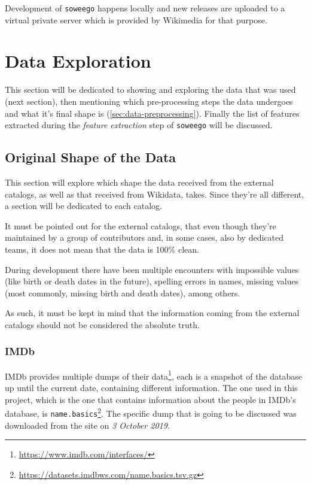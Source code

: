 \documentclass[epsfig,a4paper,11pt,titlepage,twoside,openany]{book}
\newcommand{\footurl}[1]{\footnote{\url{#1}}}
\begin{document}
Development of \texttt{soweego} happens locally and new releases are uploaded to a virtual private server which is provided by Wikimedia for that purpose. 



\section{Data Exploration}
\label{sec:data-exploration}

This section will be dedicated to showing and exploring the data that was used (next section), then mentioning which pre-processing steps the data undergoes and what it's final shape is (\autoref{sec:data-preprocessing}). Finally the list of features extracted during the \textit{feature extraction} step of \texttt{soweego} will be discussed.


\subsection{Original Shape of the Data}
\label{sec:orig-shape-of-data}

This section will explore which shape the data received from the external catalogs, as well as that received from Wikidata, takes. Since they're all different, a section will be dedicated to each catalog. 

It must be pointed out for the external catalogs, that even though they're maintained by a group of contributors and, in some cases, also by dedicated teams, it does not mean that the data is 100\% clean. 


During development there have been multiple encounters with impossible values (like birth or death dates in the future), spelling errors in  names, missing values (most commonly, missing birth and death dates), among others. 



As such, it must be kept in mind that the information coming from the external catalogs should not be considered the absolute truth.



\subsubsection{IMDb}
\label{sec:shape-imdb}

IMDb provides multiple dumps of their data\footurl{https://www.imdb.com/interfaces/}, each is a snapshot of the database up until the current date, containing different information. The one used in this project, which is the one that contains information about the people in IMDb's database, is \texttt{name.basics}\footurl{https://datasets.imdbws.com/name.basics.tsv.gz}. The specific dump that is going to be discussed was downloaded from the site on \textit{3 October 2019}.
\end{document}
